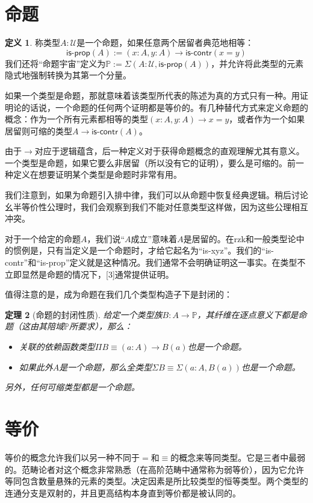 \documentclass{ctexrep}
\theoremstyle{plain}
\newtheorem{theorem}{定理}[section]
\theoremstyle{definition}
\newtheorem{definition}[theorem]{定义}
\theoremstyle{remark}
\theoremstyle{definition}
\theoremstyle{definition}
\theoremstyle{definition}
\newcommand{\coloneqq}{\mathrel{:=}}
\newcommand{\iscontr}{\mathsf{is\text{-}contr}}
\newcommand{\isprop}{\mathsf{is\text{-}prop}}
\newcommand{\UU}{\mathcal{U}}
\begin{document}
\section{命题}

\begin{definition}
称类型$A:\UU$是一个命题，如果任意两个居留者典范地相等：
\[
\isprop(A)\coloneqq (x:A,y:A)\to\iscontr(x=y)
\]
我们还将“命题宇宙”定义为$\mathbb{P}\coloneqq \Sigma(A:\UU,\isprop(A))$，并允许将此类型的元素隐式地强制转换为其第一个分量。
\end{definition}

如果一个类型是命题，那就意味着该类型所代表的陈述为真的方式只有一种。用证明论的话说，一个命题的任何两个证明都是等价的。有几种替代方式来定义命题的概念：作为一个所有元素都相等的类型$(x:A,y:A)\to x=y$，或者作为一个如果居留则可缩的类型$A\to\iscontr(A)$。

由于$\to$对应于逻辑蕴含，后一种定义对于获得命题概念的直观理解尤其有意义。一个类型是命题，如果它要么非居留（所以没有它的证明），要么是可缩的。前一种定义在想要证明某个类型是命题时非常有用。

我们注意到，如果为命题引入排中律，我们可以从命题中恢复经典逻辑。稍后讨论幺半等价性公理时，我们会观察到我们不能对任意类型这样做，因为这些公理相互冲突。

对于一个给定的命题$A$，我们说“$A$成立”意味着$A$是居留的。在rzk和一般类型论中的惯例是，只有当定义是一个命题时，才给它起名为“is-xyz”。我们的“is-contr”和“is-prop”定义就是这种情况。我们通常不会明确证明这一事实。在类型不立即显然是命题的情况下，[3]通常提供证明。

值得注意的是，成为命题在我们几个类型构造子下是封闭的：

\begin{theorem}[命题的封闭性质]
给定一个类型族$B:A\to\mathbb{P}$，其纤维在逐点意义下都是命题（这由其陪域$\mathbb{P}$所要求），那么：
\begin{itemize}
\item 关联的依赖函数类型$\Pi B\equiv (a:A)\to B(a)$也是一个命题。
\item 如果此外$A$是一个命题，那么全类型$\Sigma B\equiv \Sigma(a:A,B(a))$也是一个命题。
\end{itemize}
另外，任何可缩类型都是一个命题。
\end{theorem}

\section{等价}

等价的概念允许我们以另一种不同于$=$和$\equiv$的概念来等同类型。它是三者中最弱的。范畴论者对这个概念非常熟悉（在高阶范畴中通常称为弱等价），因为它允许等同包含数量悬殊的元素的类型。决定因素是所比较类型的恒等类型。两个类型的连通分支是双射的，并且更高结构本身直到等价都是被认同的。
\end{document}
